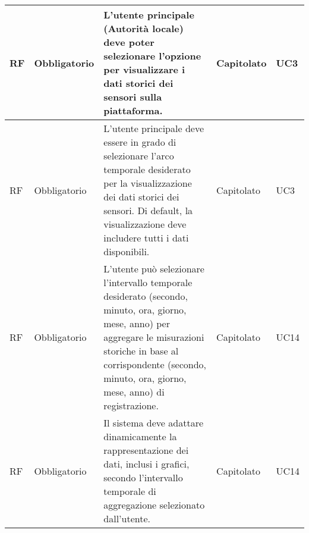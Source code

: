 \begin{longtable}{|C{1cm}|C{2cm}|>{\raggedright}m{5cm}|C{2cm}|C{1.5cm}|}
    \hline
     RF & Obbligatorio        & L'utente principale (Autorità locale) deve poter selezionare l'opzione per visualizzare i dati storici dei sensori sulla piattaforma.                                                                                              & Capitolato      & UC3               \\
    \hline
     RF & Obbligatorio        & L'utente principale deve essere in grado di selezionare l'arco temporale desiderato per la visualizzazione dei dati storici dei sensori. Di default, la visualizzazione deve includere tutti i dati disponibili.                   & Capitolato      & UC3               \\
    \hline
     RF & Obbligatorio        & L'utente può selezionare l'intervallo temporale desiderato (secondo, minuto, ora, giorno, mese, anno) per aggregare le misurazioni storiche in base al corrispondente (secondo, minuto, ora, giorno, mese, anno) di registrazione. & Capitolato      & UC14               \\
    \hline
     RF & Obbligatorio        &     Il sistema deve adattare dinamicamente la rappresentazione dei dati, inclusi i grafici, secondo l'intervallo temporale di aggregazione selezionato dall'utente. & Capitolato      & UC14               \\
    \hline


\end{longtable}
